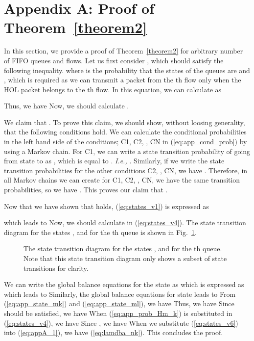 \documentclass[conference]{IEEEtran}
\newcommand{\Ie}{{\em I.e., }}
\begin{document}
\section*{Appendix A: Proof of Theorem~\ref{theorem2}}
In this section, we provide a proof of Theorem~\ref{theorem2} for arbitrary number of FIFO queues and flows. 
Let us first consider , which should satisfy the following inequality. 
 where  is the probability that the states of the queues are  and , which is required as we can transmit a packet from the th flow only when the HOL packet belongs to the th flow. 
In this equation, we can calculate  as 
 
 Thus, we have
 Now, we should calculate . 

We claim that                 . To prove this claim, we should show, without loosing generality, that the following conditions hold. 
 We can calculate the conditional probabilities in the left hand side of the conditions; C1, C2, , CN in (\ref{eq:app_cond_prob}) by using a Markov chain. For C1, we can write a state transition probability of going from state  to  as    , which is equal to . \Ie     . Similarly, if we write the state transition probabilities for the other conditions C2, , CN, we have             . Therefore, in all Markov chains we can create for C1, C2, , CN, we have the same transition probabilities, so we have       . This proves our claim that           . 

Now that we have shown that            holds, (\ref{eq:states_v1}) is expressed as
 
which leads to 
 Now, we should calculate  in (\ref{eq:states_v4}). The state transition diagram for the states ,  and for the th queue is shown in Fig.~\ref{fig:app_Km_flows}. 
\begin{figure}
\vspace{5pt}
\centering
{} 
\vspace{-5pt}
\caption{The state transition diagram for the states ,  and for the th queue. Note that this state transition diagram only shows a subset of state transitions for clarity.}
\label{fig:app_Km_flows}
\vspace{-5pt}
\end{figure}
We can write the global balance equations for the state  as 
 which is expressed as
 which leads to 
 Similarly, the global balance equations for state  leads to 
 From (\ref{eq:app_state_mk}) and (\ref{eq:app_state_ml}), we have 
 Thus, we have 
 Since  should be satisfied, we have 
 When (\ref{eq:app_prob_Hm_k}) is substituted in (\ref{eq:states_v4}), we have 
 Since , we have 
 When we substitute (\ref{eq:states_v6}) into (\ref{eq:appA_1}), we have (\ref{eq:lamdba_nk}). This concludes the proof. 
\end{document}
